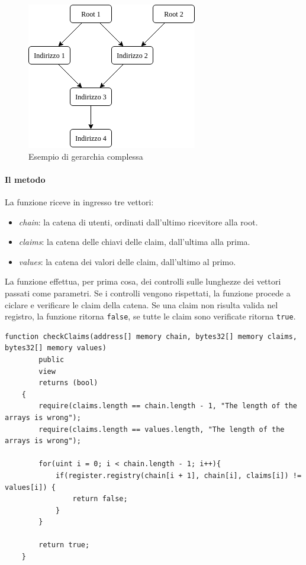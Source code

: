 \begin{figure}[ht!]
    \centering
    \includegraphics[scale=0.75]{img/gerarchia.png}
    \caption{Esempio di gerarchia complessa}
    \label{fig:gerarchia}
\end{figure}

\paragraph{Il metodo}
La funzione riceve in ingresso tre vettori:
\begin{itemize}
    \item \emph{chain}: la catena di utenti, ordinati dall'ultimo ricevitore alla root.
    \item \emph{claims}: la catena delle chiavi delle claim, dall'ultima alla prima.
    \item \emph{values}: la catena dei valori delle claim, dall'ultimo al primo.
\end{itemize}

La funzione effettua, per prima cosa, dei controlli sulle lunghezze dei vettori passati come parametri. Se i controlli vengono rispettati, la funzione procede a ciclare e verificare le claim della catena. Se una claim non risulta valida nel registro, la funzione ritorna \texttt{false}, se tutte le claim sono verificate ritorna \texttt{true}.

\noindent
\begin{lstlisting}[language=Solidity]
    function checkClaims(address[] memory chain, bytes32[] memory claims, bytes32[] memory values)
        public
        view
        returns (bool)
    {
        require(claims.length == chain.length - 1, "The length of the arrays is wrong");
        require(claims.length == values.length, "The length of the arrays is wrong");
    
        for(uint i = 0; i < chain.length - 1; i++){
            if(register.registry(chain[i + 1], chain[i], claims[i]) != values[i]) {
                return false;
            }
        }
    
        return true;
    }
\end{lstlisting}

